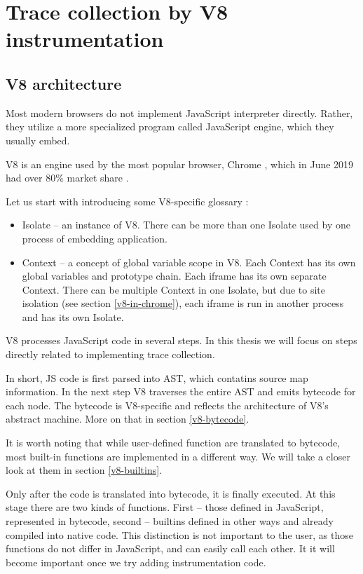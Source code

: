 \chapter{Trace collection by V8 instrumentation}
\label{v8-instrumentation}

\section{V8 architecture}
Most modern browsers do not implement JavaScript interpreter directly. Rather, they utilize a more
specialized program called JavaScript engine, which they usually embed. 

V8 is an engine used by the most popular browser, Chrome \cite{v8:main-page}, which in June 2019 
had over 80\% market share  \cite{w3:browsers}.

Let us start with introducing some V8-specific glossary \cite{v8:bindings}:
\begin{itemize}
  \item Isolate -- an instance of V8. There can be more than one Isolate used by one process of embedding application.
  \item Context -- a concept of global variable scope in V8. Each Context has its own global variables and prototype chain.
           Each iframe has its own separate Context. There can be multiple Context in one Isolate, but due to site isolation 
           (see section \ref{v8-in-chrome}), each iframe is run in another process and has its own Isolate.
\end{itemize}

V8 processes JavaScript code in several steps. In this thesis we will focus on steps
directly related to implementing trace collection.

In short, JS code is first parsed into AST, which contatins source map information. 
In the next step V8 traverses the entire AST and emits bytecode for each node.
The bytecode is V8-specific and reflects the architecture of V8's abstract machine.
More on that in section \ref{v8-bytecode}.

It is worth noting that while user-defined function are translated to bytecode,
most built-in functions are implemented in a different way. We will take a closer look at them
in section \ref{v8-builtins}.

Only after the code is translated into bytecode, it is finally executed. At this stage there are two
kinds of functions. First -- those defined in JavaScript, represented in bytecode, second -- builtins
defined in other ways and already compiled into native code. This distinction is not important 
to the user, as those functions do not differ in JavaScript, and can easily call each other.
It it will become important once we try adding instrumentation code.

